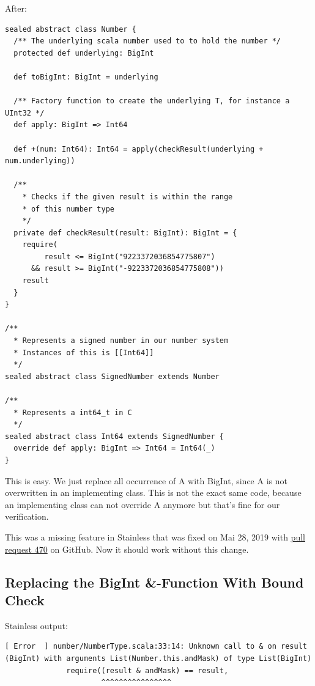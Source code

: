 \documentclass[runningheads]{llncs}
\begin{document}
After:
\begin{lstlisting}[style=scala]
sealed abstract class Number {
  /** The underlying scala number used to to hold the number */
  protected def underlying: BigInt

  def toBigInt: BigInt = underlying

  /** Factory function to create the underlying T, for instance a UInt32 */
  def apply: BigInt => Int64

  def +(num: Int64): Int64 = apply(checkResult(underlying + num.underlying))

  /**
    * Checks if the given result is within the range
    * of this number type
    */
  private def checkResult(result: BigInt): BigInt = {
    require(
         result <= BigInt("9223372036854775807")
      && result >= BigInt("-9223372036854775808"))
    result
  }
}

/**
  * Represents a signed number in our number system
  * Instances of this is [[Int64]]
  */
sealed abstract class SignedNumber extends Number

/**
  * Represents a int64_t in C
  */
sealed abstract class Int64 extends SignedNumber {
  override def apply: BigInt => Int64 = Int64(_)
}
\end{lstlisting}

This is easy.
We just replace all occurrence of A with BigInt, since A is not overwritten in an implementing class.
This is not the exact same code, because an implementing class can not override A anymore but that's fine for our verification.

This was a missing feature in Stainless that was fixed on Mai 28, 2019 with \href{https://github.com/epfl-lara/stainless/pull/470}{pull request 470} on GitHub.
Now it should work without this change.


\subsection{Replacing the BigInt \&-Function With Bound Check}
\label{sec:bound_check}

Stainless output:
\begin{lstlisting}[style=stainless]
[ Error  ] number/NumberType.scala:33:14: Unknown call to & on result (BigInt) with arguments List(Number.this.andMask) of type List(BigInt)
              require((result & andMask) == result,
                      ^^^^^^^^^^^^^^^^
\end{lstlisting}
\end{document}
